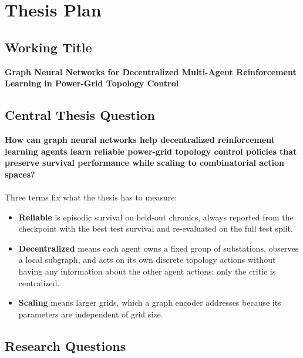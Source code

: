 \chapter{Thesis Plan}

\section{Working Title}
\label{sec:plan-title}

\textbf{Graph Neural Networks for Decentralized Multi-Agent Reinforcement
Learning in Power-Grid Topology Control}

\section{Central Thesis Question}
\label{sec:plan-question}

\textbf{How can graph neural networks help decentralized
reinforcement learning agents learn reliable power-grid topology control
policies that preserve survival performance while scaling to combinatorial
action spaces?}
\\
\\
Three terms fix what the thesis has to measure:

\begin{itemize}
  \item \textbf{Reliable} is episodic survival on held-out chronics, always
  reported from the checkpoint with the best test survival and re-evaluated on
  the full test split.
  \item \textbf{Decentralized} means each agent owns a fixed group of
  substations, observes a local subgraph, and acts on its own discrete topology
  actions without having any information about the other agent actions; only the critic is centralized.
  \item \textbf{Scaling} means larger grids, which a graph encoder addresses because its
  parameters are independent of grid size.
\end{itemize}

\section{Research Questions}
\label{sec:plan-research-questions}

